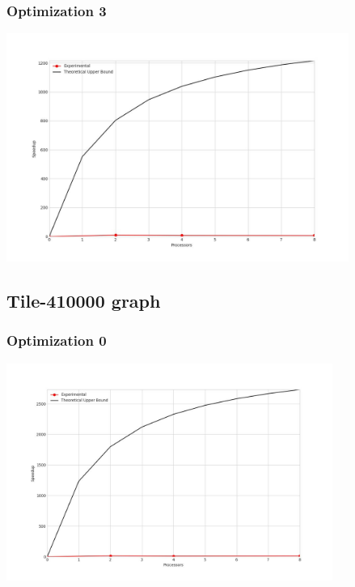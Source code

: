 \subsubsection{Optimization 3}
\begin{center}
    \resizebox{0.95\textwidth}{!}{}
    \includegraphics[width=0.84\textwidth]{../img/speedup-graph_type-tile-205000-O3}
\end{center}

\clearpage
\subsection{Tile-410000 graph}
\subsubsection{Optimization 0}
\begin{center}
    \resizebox{0.95\textwidth}{!}{}
    \includegraphics[width=0.8\textwidth]{../img/speedup-graph_type-tile-410000-O0}
\end{center}


